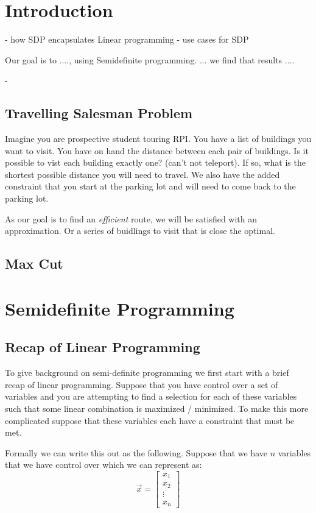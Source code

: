 \documentclass{article}
\begin{document}
\section{Introduction}
- how SDP encapsulates Linear programming
- use cases for SDP

Our goal is to ...., using Semidefinite programming. ... we find that results ....


-

\subsection{Travelling Salesman Problem}
Imagine you are prospective student touring RPI. You have a list of buildings you want to visit.
You have on hand the distance between each pair of buildings. Is it possible to vist each building exactly one?
(can't not teleport). If so, what is the shortest possible distance you will need to travel. We also 
have the added constraint that you start at the parking lot and will need to come back to the parking lot.

As our goal is to find an \emph{efficient} route, we will be satisfied with an approximation. 
Or a series of buidlings to visit that is close the optimal.

\subsection{Max Cut}

\section{Semidefinite Programming}

\subsection{Recap of Linear Programming}
To give background on semi-definite programming we first start with a brief recap of linear programming. Suppose that you have control over a set of variables and you are attempting to find a selection for each of these variables such that some linear combination is maximized / minimized. To make this more complicated suppose that these variables each have a constraint that must be met.

Formally we can write this out as the following. Suppose that we have \( n \) variables that we have control over which we can represent as:
\[
\vec{x} = \begin{bmatrix} x_1 \\ x_2 \\ \vdots \\ x_n \end{bmatrix}
\]
\end{document}
